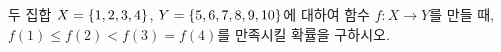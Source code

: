두 집합 $X=\{1{,}\mkern3mu\mathopen{}2{,}\mkern3mu\mathopen{}3{,}\mkern3mu\mathopen{}4\}$, $Y=\{5{,}\mkern3mu\mathopen{}6{,}\mkern3mu\mathopen{}7{,}\mkern3mu\mathopen{}8{,}\mkern3mu\mathopen{}9{,}\mkern3mu\mathopen{}10\}$에 대하여 함수 $f\colon X\longrightarrow Y$를 만들 때, $f(1)\le f(2)<f(3)=f(4)$를 만족시킬 확률을 구하시오.
